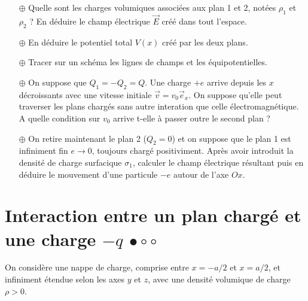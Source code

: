 \documentclass{report}
\begin{document}
\begin{itemize}

	\item[$\oplus$] Quelle sont les charges volumiques associées aux plan 1 et 2, notées $\rho_1$ et $\rho_2$ ? En déduire le champ électrique $\vec{E}$ créé dans tout l'espace.

	\item[$\oplus$] En déduire le potentiel total $V(x)$ créé par les deux plans.
	
	\item[$\oplus$] Tracer sur un schéma les lignes de champs et les équipotentielles. 
	
	\item[$\oplus$] On suppose que $Q_1=-Q_2=Q$. Une charge $+e$ arrive depuis les $x$ décroissants avec une vitesse initiale $\vec{v}=v_0\vec{e}_x$. On suppose qu'elle peut traverser les plans chargés sans autre interation que celle électromagnétique. A quelle condition sur $v_0$ arrive t-elle à passer outre le second plan ? 
	
	\item[$\oplus$] On retire maintenant le plan 2 ($Q_2=0$) et on suppose que le plan 1 est infiniment fin $e\longrightarrow0$, toujours chargé positiviment. Après avoir introduit la densité de charge surfacique $\sigma_1$, calculer le champ électrique résultant puis en déduire le mouvement d'une particule $-e$ autour de l'axe $Ox$.

\end{itemize}

\newpage

\section*{Interaction entre un plan chargé et une charge $-q$ $\bullet\circ\circ$}

On considère une nappe de charge, comprise entre $x=-a/2$ et $x=a/2$, et infiniment étendue selon les axes $y$ et $z$, avec une densité volumique de charge $\rho>0$.
\end{document}
